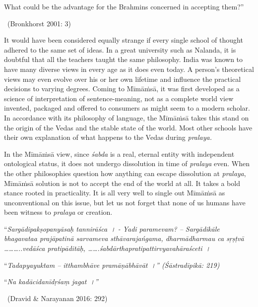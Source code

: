 \begin{myquote}
What could be the advantage for the Brahmins concerned in accepting them?” 

~\hfill (Bronkhorst 2001: 3)
\end{myquote}

It would have been considered equally strange if every single school of thought adhered to the same set of ideas. In a great university such as Nalanda, it is doubtful that all the teachers taught the same philosophy. India was known to have many diverse views in every age as it does even today. A person’s theoretical views may even evolve over his or her own lifetime and influence the practical decisions to varying degrees. Coming to Mīmāṁsā, it was first developed as a science of interpretation of sentence-meaning, not as a complete world view invented, packaged and offered to consumers as might seem to a modern scholar. In accordance with its philosophy of language, the Mīmāṁsā takes this stand on the origin of the Vedas and the stable state of the world. Most other schools have their own explanation of what happens to the Vedas during \textit{pralaya.}

In the Mīmāṁsā view, since \textit{śabda} is a real, eternal entity with independent ontological status, it does not undergo dissolution in time of \textit{pralaya} even. When the other philosophies question how anything can escape dissolution at \textit{pralaya}, Mīmāṁsā solution is not to accept the end of the world at all. It takes a bold stance rooted in practicality. It is all very well to single out Mīmāṁsā as unconventional on this issue, but let us not forget that none of us humans have been witness to \textit{pralaya} or creation.

\begin{myquote}
“\textit{Sargādipakṣopanyāsaḥ tannirāśca~। - Yadi paramevam? – Sargādikāle bhagavataa prajāpatinā sarvameva sthāvarajańgama, dharmādharmau ca sŗṣṭvā ………..vedāśca pratipāditāḥ, …….śabdārthapratipattirvyavahāraśceti~।}
\end{myquote}

\begin{myquote}
“\textit{Tadapyayuktam – itthambhāve pramāṇābhāvāt~।” (Śāstradīpikā: 219)}
\end{myquote}

\begin{myquote}
“\textit{Na kadācidanīdṛśaṃ jagat~।”}

~\hfill (Dravid \& Narayanan 2016: 292)
\end{myquote}

